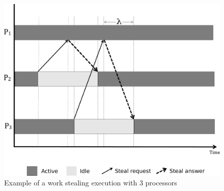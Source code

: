 \begin{figure}[tp!]
  \centering
  \includegraphics[width=0.6\linewidth]{figures/ws.pdf}
  \caption{Example of a work stealing execution with 3 processors} 
  \label{fig:workStealing}
\end{figure}




